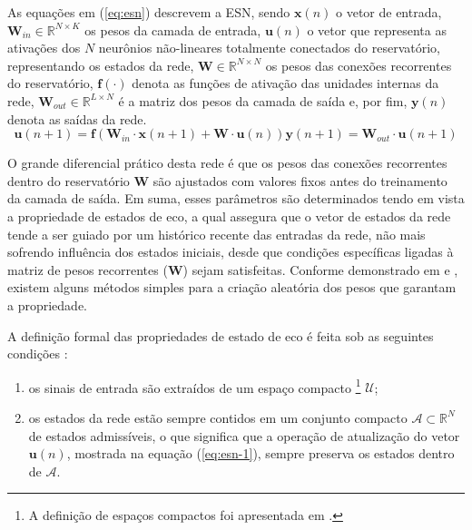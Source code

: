 \documentclass[a4paper, 12pt]{article}
\begin{document}
As equações em (\ref{eq:esn}) descrevem a ESN, sendo $\mathbf{x}(n)$ o vetor de entrada, $\mathbf{W}_{in} \in \mathbb{R}^{N \times K}$ os pesos da camada de entrada, $\mathbf{u}(n)$ o vetor que representa as ativações dos $N$ neurônios não-lineares totalmente conectados do reservatório, representando os estados da rede, $\mathbf{W} \in \mathbb{R}^{N \times N}$ os pesos das conexões recorrentes do reservatório, $\mathbf{f}(\cdot)$ denota as funções de ativação das unidades internas da rede, $\mathbf{W}_{out} \in \mathbb{R}^{L \times N}$ é a matriz dos pesos da camada de saída e, por fim, $\mathbf{y}(n)$ denota as saídas da rede.
\begin{subequations}\label{eq:esn}
\begin{equation} \label{eq:esn-1}
\mathbf{u}(n+1) = \mathbf{f}(\mathbf{W}_{in} \cdot \mathbf{x}(n+1) + \mathbf{W} \cdot \mathbf{u}(n)) 
\end{equation}
\begin{equation} \label{eq:esn-2}
\mathbf{y}(n+1) = \mathbf{W}_{out} \cdot \mathbf{u}(n+1)
\end{equation}
\end{subequations}

O grande diferencial prático desta rede é que os pesos das conexões recorrentes dentro do reservatório $\mathbf{W}$ são ajustados com valores fixos antes do treinamento da camada de saída. Em suma, esses parâmetros são determinados tendo em vista a propriedade de estados de eco, a qual assegura que o vetor de estados da rede tende a ser guiado por um histórico recente das entradas da rede, não mais sofrendo influência dos estados iniciais, desde que condições específicas ligadas à matriz de pesos recorrentes ($\mathbf{W}$) sejam satisfeitas. Conforme demonstrado em \cite{yildiz2012re} e \cite{gallicchio2018design}, existem alguns métodos simples para a criação aleatória dos pesos que garantam a propriedade. 

A definição formal das propriedades de estado de eco é feita sob as seguintes condições \cite{boccato2013novas}:

\begin{enumerate}
\item os sinais de entrada são extraídos de um espaço compacto \footnote{ A definição de espaços compactos foi apresentada em \cite{alexandroff1929memoire}.} $\mathcal{U}$;
\item os estados da rede estão sempre contidos em um conjunto compacto $\mathcal{A} \subset \mathbb{R}^N$ de estados admissíveis, o que significa que a operação de atualização do vetor $\mathbf{u}(n)$, mostrada na equação (\ref{eq:esn-1}), sempre preserva os estados dentro de $\mathcal{A}$.
\end{enumerate}
\end{document}
